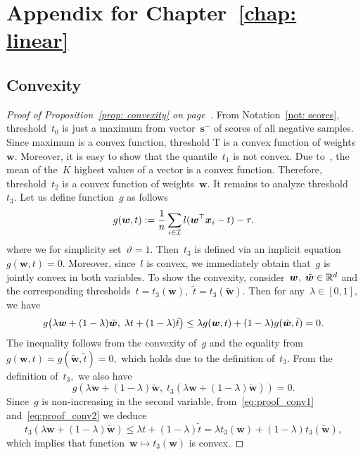 \chapter{Appendix for Chapter~\ref{chap: linear}}
\section{Convexity}

\propconvex*
\begin{proof}[Proof of Proposition~\ref{prop: convexity} on page~\pageref{prop: convexity}]
  From Notation~\ref{not: scores}, threshold~$t_0$ is just a maximum from vector~$\bm{s}^-$ of scores of all negative samples.  Since maximum is a convex function, threshold T is a convex function of weights~$\bm{w}.$ Moreover, it is easy to show that the quantile~$t_1$ is not convex. Due to~\cite{lapin2015top}, the mean of the~$K$ highest values of a vector is a convex function. Therefore, threshold~$t_2$ is a convex function  of weights~$\bm{w}.$ It remains to analyze threshold~$t_3.$ Let us define function~$g$ as follows
  \begin{equation*}
    g(\bm{w},t) := \frac{1}{n} \sum_{i \in \mathcal{I}} l(\bm{w}^{\top} \bm{x}_i - t) - \tau.
  \end{equation*}
  where we for simplicity set~$\vartheta = 1.$ Then~$t_3$ is defined via an implicit equation~$g(\bm{w},t) = 0.$ Moreover, since~$l$ is convex, we immediately obtain that~$g$ is jointly convex in both variables. To show the convexity, consider~$\bm{w}, \; \tilde{\bm{w}} \in \mathbb{R}^d$ and the corresponding thresholds~$t = t_3(\bm{w})$,~$\tilde{t} = t_3(\tilde{\bm{w}})$. Then for any~$\lambda\in[0,1],$ we have 
  \begin{equation}\label{eq:proof_conv1}
    g\Brac{\lambda \bm{w} + (1 - \lambda)\tilde{\bm{w}}, \;\lambda t + (1 - \lambda)\tilde{t}}
    \leq \lambda g(\bm{w}, t) + (1 - \lambda) g(\tilde{\bm{w}}, \tilde{t}) = 0.
  \end{equation}
  The inequality follows from the convexity of~$g$  and the equality from~$g(\bm{w}, t) = g(\tilde{\bm{w}}, \tilde{t}) = 0,$ which holds due to the definition of~$t_3.$ From the definition of~$t_3,$ we also have
  \begin{equation}\label{eq:proof_conv2}
    g(\lambda\bm{w} + (1-\lambda)\tilde{\bm{w}}, \; t_3(\lambda\bm{w} + (1-\lambda)\tilde{\bm{w}})) = 0.
  \end{equation}
  Since~$g$ is non-increasing in the second variable, from~\eqref{eq:proof_conv1} and~\eqref{eq:proof_conv2} we deduce
  \begin{equation*}
    t_3(\lambda\bm{w} + (1-\lambda)\tilde{\bm{w}})
    \leq \lambda t + (1-\lambda)\tilde{t}
    =   \lambda t_3(\bm{w})+(1-\lambda) t_3(\tilde{\bm{w}}),
  \end{equation*}
  which implies that function~$\bm{w}\mapsto t_3(\bm{w})$ is convex.
\end{proof}

